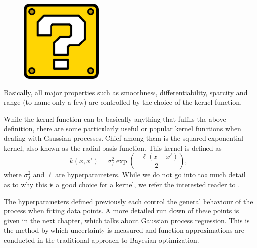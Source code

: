 \begin{figure}[h]
	\includegraphics[width=4cm]{Figures/missing.png}
	\centering
	\label{trajectories}
\end{figure}

Basically, all major properties such as smoothness, differentiability, sparcity and range (to name only a few) are controlled by the choice of the kernel function. 

While the kernel function can be basically anything that fulfils the above definition, there are some particularly useful or popular kernel functions when dealing with Gaussian processes. Chief among them is the squared exponential kernel, also known as the radial basis function. This kernel is defined as
\[ k(x, x') = \sigma_f^2 \exp \left( \frac{- \ell (x - x')}{2} \right), \]
where $\sigma_f^2$ and $\ell$ are hyperparameters. While we do not go into too much detail as to why this is a good choice for a kernel, we refer the interested reader to \cite[\S 2.1]{garnett_bayesoptbook_2023}. 

The hyperparameters defined previously each control the general behaviour of the process when fitting data points. A more detailed run down of these points is given in the next chapter, which talks about Gaussian process regression. This is the method by which uncertainty is measured and function approximations are conducted in the traditional approach to Bayesian optimization. 





